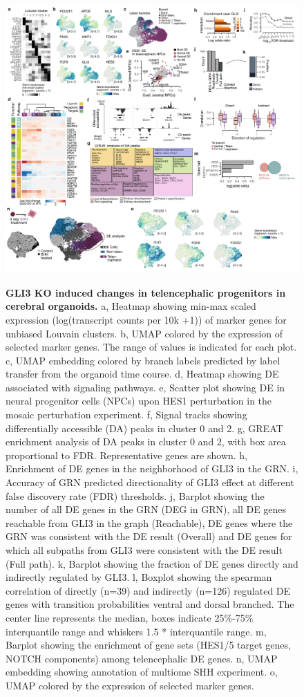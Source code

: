\begin{figure}[h!]
    \centering
	\includegraphics[width=\textwidth]{figures/pando/Figure_S10}
    \label{fig:regS10}
    \caption{\textbf{GLI3 KO induced changes in telencephalic progenitors in cerebral organoids.} a, Heatmap showing min-max scaled expression (log(transcript counts per 10k +1)) of marker genes for unbiased Louvain clusters. b,  UMAP colored by the expression of selected marker genes. The range of values is indicated for each plot. c, UMAP embedding colored by branch labels predicted by label transfer from the organoid time course. d, Heatmap showing DE associated with signaling pathways. e, Scatter plot showing DE in neural progenitor cells (NPCs) upon HES1 perturbation in the mosaic perturbation experiment. f, Signal tracks showing differentially accessible (DA) peaks in cluster 0 and 2. g, GREAT enrichment analysis of DA peaks in cluster 0 and 2, with box area proportional to FDR. Representative genes are shown. h, Enrichment of DE genes in the neighborhood of GLI3 in the GRN. i, Accuracy of GRN predicted directionality of GLI3 effect at different false discovery rate (FDR) thresholds. j, Barplot showing the number of all DE genes in the GRN (DEG in GRN), all DE genes reachable from GLI3 in the graph (Reachable), DE genes where the GRN was consistent with the DE result (Overall) and DE genes for which all subpaths from GLI3 were consistent with the DE result (Full path). k, Barplot showing the fraction of DE genes directly and indirectly regulated by GLI3. l, Boxplot showing the spearman correlation of directly (n=39) and indirectly (n=126) regulated DE genes with transition probabilities ventral and dorsal branched. The center line represents the median, boxes indicate 25\%-75\% interquantile range and whiskers 1.5 * interquantile range. m, Barplot showing the enrichment of gene sets (HES1/5 target genes, NOTCH components) among telencephalic DE genes. n, UMAP embedding showing annotation of multiome SHH experiment. o, UMAP colored by the expression of selected marker genes.}
\end{figure}








